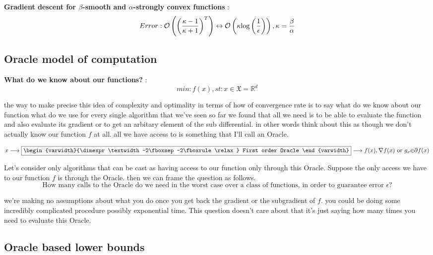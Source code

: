 \documentclass[twoside]{article}
\begin{document}
\textbf{Gradient descent for $\beta$-smooth and $\alpha$-strongly convex functions} : $$ Error: \mathcal{O}\left(\left({\kappa-1 \over \kappa+1}\right)^T\right)  \leftrightarrow \mathcal{O}\left(\kappa{\log\left({1 \over \epsilon}\right)}\right) , \kappa = {\beta \over \alpha}  $$



\subsection{Oracle model of computation}

\textbf{What do we know about our functions?} : $$min:f(x)
, st: x \in \mathfrak{X}=\mathds{R}^d$$

the way to make precise this idea of complexity and optimality in terms of how of convergence rate is to say what do we know about our function what do we use for every single algorithm that we've seen so far we found that all we need is to be able to evaluate the function and also evaluate its gradient or to get an arbitary element of the sub differential. in other words think about this as though we don't actually know our function $f$ at all. all we have access to is something that I'll call an Oracle. 


$$x\longrightarrow
\fbox{\begin{varwidth}{\dimexpr\textwidth-2\fboxsep-2\fboxrule\relax}
First order Oracle

\end{varwidth}}
\longrightarrow f(x),{\nabla}f(x) {\text{ or }} g_x {\in} {\partial}f(x)$$	 


Let's consider only algorithms that can be cast as having access to our function only through this Oracle.
Suppose the only access we have to our function $f$ is through the Oracle. then we can frame the question as follows.
$$\text{How many calls to the Oracle do we need in the worst case over a class of functions, in order to guarantee error }\epsilon?$$

we're making no assumptions about what you do once you get back the gradient or the subgradient of $f$. you could be doing some incredibly complicated procedure possibly exponential time. This question doesn't care about that it's just saying how many times you need to evaluate this Oracle.

\subsection{Oracle based lower bounds}
\end{document}
